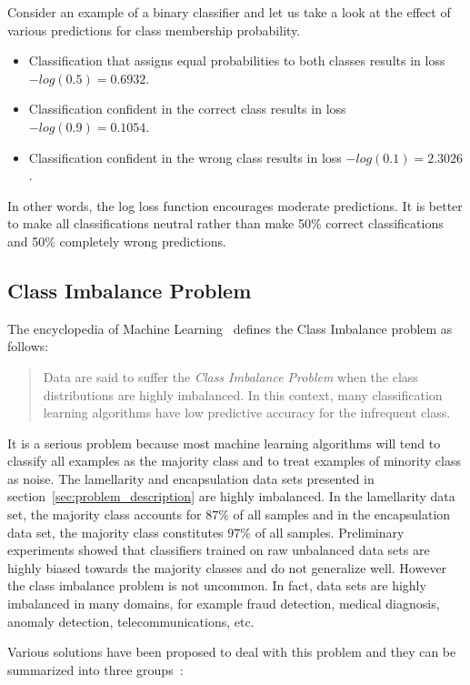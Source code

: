 \documentclass[a4paper, 11pt, table]{article}
\begin{document}
Consider an example of a binary classifier and let us take a look at the effect of various predictions for class membership probability. 
\begin{itemize}
\item Classification that assigns equal probabilities to both classes results in loss $-log(0.5)=0.6932$.  

\item Classification confident in the correct class results in loss $-log(0.9)=0.1054$.

\item Classification confident in the wrong class results in loss $-log(0.1)=2.3026$. 
\end{itemize}

In other words, the log loss function encourages moderate predictions. It is better to make all classifications neutral rather than make 50\% correct classifications and 50\% completely wrong predictions.

\subsection{Class Imbalance Problem}
\label{sec:class_imbalance}
The encyclopedia of Machine Learning~\cite{Ling2010} defines the Class Imbalance problem as follows:
\blockquote{Data are said to suffer the \textit{Class Imbalance Problem} when the class distributions are highly imbalanced. In this context, many classification learning algorithms have low predictive accuracy for the infrequent class.}

It is a serious problem because most machine learning algorithms will tend to classify all examples as the majority class and to treat examples of minority class as noise. The lamellarity and encapsulation data sets presented in section~\ref{sec:problem_description} are highly imbalanced. In the lamellarity data set, the majority class accounts for $87\%$ of all samples and in the encapsulation data set, the majority class constitutes $97\%$ of all samples. Preliminary experiments showed that classifiers trained on raw unbalanced data sets are highly biased towards the majority classes and do not generalize well. However the class imbalance problem is not uncommon. In fact, data sets are highly imbalanced in many domains, for example fraud detection, medical diagnosis, anomaly detection, telecommunications, etc. 

Various solutions have been proposed to deal with this problem and they can be summarized into three groups~\cite{Lopez2013113}:
\end{document}
